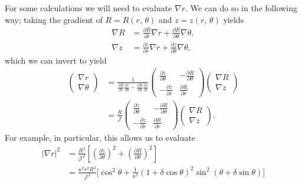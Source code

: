 \documentclass[11pt,a4paper]{article}
\begin{document}
For some calculations we will need to evaluate $\nabla r$. We can do so in the following way; taking the gradient of $R=R(r,\,\theta)$ and $z = z(r,\,\theta)$ yields
\begin{align}
\nabla R &= \frac{\partial R}{\partial r}\nabla r + \frac{\partial R}{\partial \theta}\nabla\theta, \nonumber \\
\nabla z &= \frac{\partial z}{\partial r} \nabla r + \frac{\partial z}{\partial \theta}\nabla \theta,
\end{align}
which we can invert to yield
\begin{align}
\begin{pmatrix}
\nabla r \\
\nabla \theta
\end{pmatrix} &= 
\frac{1}{\frac{\partial R}{\partial r}\frac{\partial z}{\partial \theta} - \frac{\partial R}{\partial \theta}\frac{\partial z}{\partial r}}
\begin{pmatrix}
\frac{\partial z}{\partial \theta} & -\frac{\partial R}{\partial \theta} \\
-\frac{\partial z}{\partial r} & \frac{\partial R}{\partial r}
\end{pmatrix}
\begin{pmatrix}
\nabla R \\
\nabla z
\end{pmatrix}
 \nonumber \\
&=\frac{R}{\mathcal{J}}\begin{pmatrix}
\frac{\partial z}{\partial \theta} & -\frac{\partial R}{\partial \theta} \\
-\frac{\partial z}{\partial r} & \frac{\partial R}{\partial r}
\end{pmatrix} \begin{pmatrix}
\nabla R \\
\nabla z
\end{pmatrix}
.
\end{align}
For example, in particular, this allows us to evaluate
\begin{align}
|\nabla r|^2 &= \frac{R^2}{\mathcal{J}^2} \left[ \left(\frac{\partial z}{\partial \theta}\right)^2 + \left(\frac{\partial R}{\partial \theta}\right)^2\right] \nonumber \\
&= \frac{\kappa^2 r^2R^2}{\mathcal{J}^2}\Big[  \cos^2\theta + \frac{1}{\kappa^2}(1+\delta\cos\theta)^2\sin^2(\theta+\delta\sin\theta)\Big]
\end{align}
\end{document}
